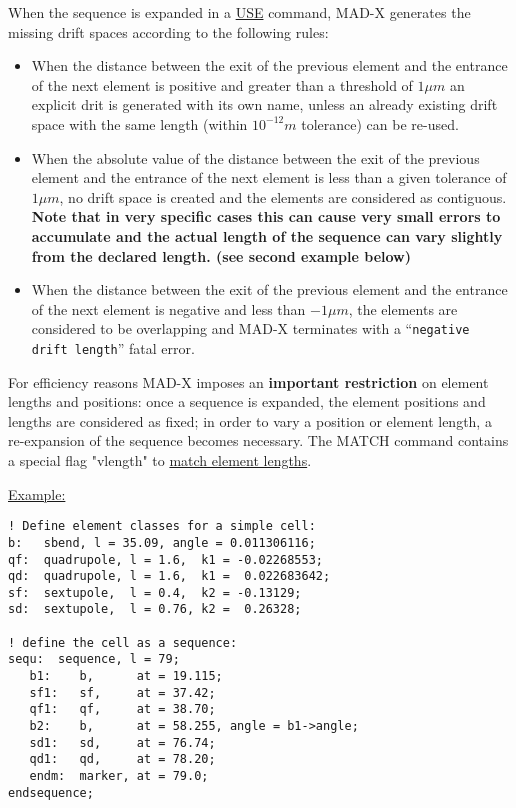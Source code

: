 When the sequence is expanded in a
\href{../control/general.html#use}{USE} command, MAD-X
generates the missing drift spaces according to the following rules:
\begin{itemize}
\item When the distance between the exit of the previous element and the
  entrance of the next element is positive and greater than a threshold
  of $1 \mu m$ an explicit drit is generated with its own name, unless
  an already existing drift space with the same length (within $10^{-12}
  m$ tolerance) can be re-used.
\item When the absolute value of the distance between the exit of the 
  previous element and the entrance of the next element is less than a
  given tolerance of $1\mu m$, no drift space is created and the
  elements are considered as contiguous. \\
  {\bf Note that in very specific cases this can cause very small errors
    to accumulate and the actual length of the sequence can vary
    slightly from the declared length. (see second example below)} 
\item When the distance between the exit of the previous element and the 
  entrance of the next element is negative and less than $-1\mu m$,
  the elements are considered to be overlapping and MAD-X terminates
  with a ``{\tt negative drift length}'' fatal error. 
\end{itemize} 

For efficiency reasons MAD-X imposes an \textbf{important restriction}
on element lengths and positions: once a sequence is expanded, the
element positions and lengths are considered as fixed; in order to vary
a position or element length, a re-expansion of the sequence becomes
necessary. The MATCH command contains a special flag "vlength" to
\href{../match/match.html}{match element lengths}.  

\href{example}{Example:}
\begin{verbatim}
! Define element classes for a simple cell:
b:   sbend, l = 35.09, angle = 0.011306116;
qf:  quadrupole, l = 1.6,  k1 = -0.02268553;
qd:  quadrupole, l = 1.6,  k1 =  0.022683642;
sf:  sextupole,  l = 0.4,  k2 = -0.13129;
sd:  sextupole,  l = 0.76, k2 =  0.26328;

! define the cell as a sequence:
sequ:  sequence, l = 79;
   b1:    b,      at = 19.115;
   sf1:   sf,     at = 37.42;
   qf1:   qf,     at = 38.70;
   b2:    b,      at = 58.255, angle = b1->angle;
   sd1:   sd,     at = 76.74;
   qd1:   qd,     at = 78.20;
   endm:  marker, at = 79.0;
endsequence;
\end{verbatim}




